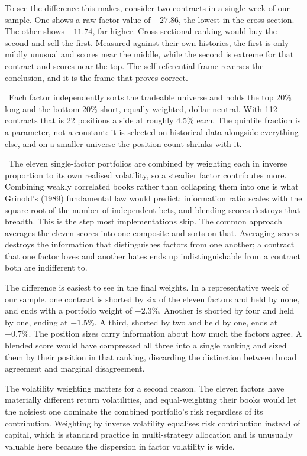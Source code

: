 \documentclass[12pt]{article}
\newcommand{\runin}[1]{\par\vspace{2pt}\noindent\hspace*{0.5in}{\bfseries #1}\ \ignorespaces}
\begin{document}
To see the difference this makes, consider two contracts in a single week of our
sample. One shows a raw factor value of $-27.86$, the lowest in the
cross-section. The other shows $-11.74$, far higher. Cross-sectional ranking would
buy the second and sell the first. Measured against their own histories, the
first is only mildly unusual and scores near the middle, while the second is
extreme for that contract and scores near the top. The self-referential frame
reverses the conclusion, and it is the frame that proves correct.

\runin{Build one portfolio per factor.}Each factor independently sorts the tradeable universe and holds the top 20\% long
and the bottom 20\% short, equally weighted, dollar neutral. With 112 contracts
that is 22 positions a side at roughly 4.5\% each. The quintile fraction is a
parameter, not a constant: it is selected on historical data alongside everything
else, and on a smaller universe the position count shrinks with it.

\runin{Combine returns, not scores.}The eleven single-factor portfolios are combined by weighting each in inverse
proportion to its own realised volatility, so a steadier factor contributes more.
Combining weakly correlated books rather than collapsing them into one is what
Grinold's (1989) fundamental law would predict: information ratio scales with the
square root of the number of independent bets, and blending scores destroys that
breadth.
This is the step most implementations skip. The common approach averages the
eleven scores into one composite and sorts on that. Averaging scores destroys the
information that distinguishes factors from one another; a contract that one
factor loves and another hates ends up indistinguishable from a contract both are
indifferent to.

The difference is easiest to see in the final weights. In a representative week of
our sample, one contract is shorted by six of the eleven factors and held by none,
and ends with a portfolio weight of $-2.3\%$. Another is shorted by four and held
by one, ending at $-1.5\%$. A third, shorted by two and held by one, ends at
$-0.7\%$. The position sizes carry information about how much the factors agree.
A blended score would have compressed all three into a single ranking and sized
them by their position in that ranking, discarding the distinction between broad
agreement and marginal disagreement.

The volatility weighting matters for a second reason. The eleven factors have
materially different return volatilities, and equal-weighting their books would let
the noisiest one dominate the combined portfolio's risk regardless of its
contribution. Weighting by inverse volatility equalises risk contribution instead
of capital, which is standard practice in multi-strategy allocation and is
unusually valuable here because the dispersion in factor volatility is wide.
\end{document}
